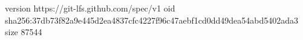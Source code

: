 version https://git-lfs.github.com/spec/v1
oid sha256:37db73f82a9e445d2ea4837cfc4227f96c47aebf1cd0dd49dea54abd5402ada3
size 87544
